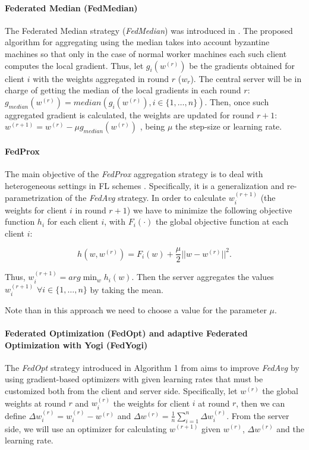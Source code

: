 \documentclass[5p,times]{elsarticle}
\begin{document}
\paragraph{Federated Median (FedMedian)}

The Federated Median strategy (\textit{FedMedian}) was introduced in \cite{fedmedian}. The proposed algorithm for aggregating using the median takes into account byzantine machines so that only in the case of normal worker machines each such client computes the local gradient. Thus, let $g_{i}(w^{(r)})$ be the gradients obtained for client $i$ with the weights aggregated in round $r$ ($w_{r}$). The central server will be in charge of getting the median of the local gradients in each round $r$: $g_{median}(w^{(r)})=median(g_{i}(w^{(r)}), i\in\{1,\hdots,n\})$. Then, once such aggregated gradient is calculated, the weights are updated for round $r+1$: $w^{(r+1)}=w^{(r)}-\mu g_{median}(w^{(r)})$ \cite{fedmedian}, being $\mu$ the step-size or learning rate.      

\paragraph{FedProx}

The main objective of the \textit{FedProx} aggregation strategy is to deal with heterogeneous settings in FL schemes \cite{fedprox}. Specifically, it is a generalization and re-parametrization of the \textit{FedAvg} strategy. In order to calculate $w_{i}^{(r+1)}$ (the weights for client $i$ in round $r+1$) we have to minimize the following objective function $h_{i}$ for each client $i$, with $F_{i}(\cdot)$ the global objective function at each client $i$:

$$
h(w, w^{(r)})=F_{i}(w) + \frac{\mu}{2}||w-w^{(r)}||^{2}.
$$

Thus, $w_{i}^{(r+1)}=arg \min_{w} h_{i}(w)$. Then the server aggregates the values $w_{i}^{(r+1)}$ $\forall i \in \{1,\hdots,n\}$ by taking the mean. 

Note than in this approach we need to choose a value for the parameter $\mu$.

\paragraph{Federated Optimization (FedOpt) and adaptive Federated Optimization with Yogi (FedYogi)}

The \textit{FedOpt} strategy introduced in Algorithm 1 from \cite{reddi2020adaptive} aims to improve \textit{FedAvg} by using gradient-based optimizers with given learning rates that must be customized both from the client and server side. Specifically, let $w^{(r)}$ the global weights at round $r$ and $w_{i}^{(r)}$ the weights for client $i$ at round $r$, then we can define $\Delta w^{(r)}_{i} = w_{i}^{(r)} - w^{(r)}$ and $\Delta w^{(r)} = \frac{1}{n}\sum_{i=1}^{n}\Delta w^{(r)}_{i}$. From the server side, we will use an optimizer for calculating $w^{(r+1)}$ given $w^{(r)}$, $\Delta w^{(r)}$ and the learning rate. 
\end{document}
